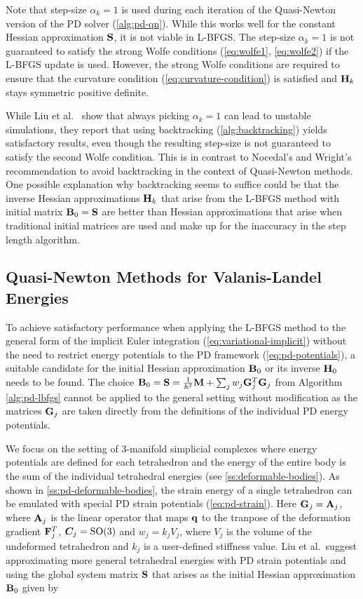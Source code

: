 Note that step-size $\alpha_k = 1$ is 
used during each iteration of the Quasi-Newton version of the PD solver (\cref{alg:pd-qn}).
While this works well for the constant Hessian approximation $\mathbf{S}$, it is not viable in L-BFGS. The step-size $\alpha_k = 1$
is not guaranteed to satisfy the strong Wolfe conditions (\cref{eq:wolfe1}, \cref{eq:wolfe2}) if the L-BFGS update is used. However,
the strong Wolfe conditions are required to ensure that the curvature condition (\cref{eq:curvature-condition}) is satisfied 
and $\mathbf{H}_k$ stays symmetric positive definite. 

While Liu et al.\ \cite{liu2017} show that always picking $\alpha_k = 1$ can lead to
unstable simulations, they report that using backtracking (\cref{alg:backtracking}) yields satisfactory results, even though 
the resulting step-size is not guaranteed to satisfy the second Wolfe condition. This is in contrast to Nocedal's and Wright's
recommendation \cite{nocedal2006} to avoid backtracking in the context of  Quasi-Newton methods. One possible explanation why 
backtracking seems to suffice could be that the inverse 
Hessian approximations $\mathbf{H}_k$ that arise from the L-BFGS method with initial matrix $\mathbf{B}_0 = \mathbf{S}$ are better than
Hessian approximations that arise when traditional initial matrices are used and make up for the inaccuracy in the step length
algorithm.

\subsection{Quasi-Newton Methods for Valanis-Landel Energies}\label{ss:qn-valanis-landel}
To achieve satisfactory performance when applying the L-BFGS method to the general form of the implicit Euler integration 
(\cref{eq:variational-implicit}) without the need to restrict energy potentials to the PD framework (\cref{eq:pd-potentials}), a suitable
candidate for the initial Hessian approximation $\mathbf{B}_0$ or its inverse $\mathbf{H}_0$ needs to be found. The choice $\mathbf{B}_0 = 
\mathbf{S} = \frac{1}{h^2}\mathbf{M} + \sum_j w_j \mathbf{G}_j^T \mathbf{G}_j$ from Algorithm \ref{alg:pd-lbfgs} cannot be applied to the general setting 
without modification as the matrices $\mathbf{G}_j$ are taken directly from the definitions of the individual PD energy potentials.

We focus on the setting of 3-manifold simplicial complexes where energy potentials are defined for each tetrahedron and the
energy of the entire body is the sum of the individual tetrahedral energies (see \autoref{ss:deformable-bodies}).
As shown in \cref{ss:pd-deformable-bodies}, the strain energy of a single tetrahedron can be emulated with special PD strain 
potentials (\cref{eq:pd-strain}). Here $\mathbf{G}_j = \mathbf{A}_j$, where $\mathbf{A}_j$ is the linear operator that maps $\mathbf{q}$ 
to the tranpose of the deformation gradient $\mathbf{F}^T_j$, $\bm{C}_j = \text{SO}(3)$ and $w_j = k_jV_j$, where $V_j$ is the
volume of the undeformed tetrahedron and $k_j$ is a user-defined stiffness value. 
Liu et al.\ suggest approximating more general tetrahedral energies with PD strain potentials and using the global system
matrix $\mathbf{S}$ that arises as the initial Hessian approximation $\mathbf{B}_0$ given by

